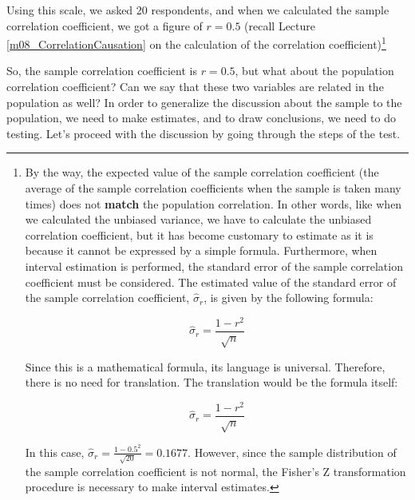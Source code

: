 \documentclass{ltjsbook}
\begin{document}
Using this scale, we asked 20 respondents, and when we calculated the sample correlation coefficient, we got a figure of $r=0.5$ (recall Lecture \ref{m08_CorrelationCausation} on the calculation of the correlation coefficient)\footnote{By the way, the expected value of the sample correlation coefficient (the average of the sample correlation coefficients when the sample is taken many times) does not \textbf{match} the population correlation. In other words, like when we calculated the unbiased variance, we have to calculate the unbiased correlation coefficient, but it has become customary to estimate as it is because it cannot be expressed by a simple formula\parencite{Haebara200206,Hirakawa2021}. Furthermore, when interval estimation is performed, the standard error of the sample correlation coefficient must be considered. The estimated value of the standard error of the sample correlation coefficient, $\hat{\sigma}_r$, is given by the following formula:

	$$\hat{\sigma}_r= \frac{1-r^2}{\sqrt{n}}$$

	Since this is a mathematical formula, its language is universal. Therefore, there is no need for translation. The translation would be the formula itself:

	$$\hat{\sigma}_r= \frac{1-r^2}{\sqrt{n}}$$

	In this case, $\hat{\sigma}_r = \frac{1-0.5^2}{\sqrt{20} }= 0.1677$. However, since the sample distribution of the sample correlation coefficient is not normal, the Fisher's Z transformation procedure is necessary to make interval estimates.}

So, the sample correlation coefficient is $r=0.5$, but what about the population correlation coefficient? Can we say that these two variables are related in the population as well? In order to generalize the discussion about the sample to the population, we need to make estimates, and to draw conclusions, we need to do testing. Let's proceed with the discussion by going through the steps of the test.

\end{document}
